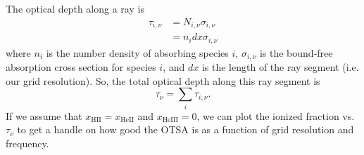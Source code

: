 \documentclass[letterpaper,titlepage,12pt]{article}
\numberwithin{equation}{section}
\newcommand{\xHII}{x_{\text{HII}}}
\newcommand{\xHeII}{x_{\text{HeII}}}
\newcommand{\xHeIII}{x_{\text{HeIII}}}
\begin{document}
The optical depth along a ray is
\begin{align}
    \tau_{i,\nu} & = N_{i,\nu} \sigma_{i,\nu} \nonumber \\
    & = n_i dx \sigma_{i,\nu}
\end{align}    
where $n_i$ is the number density of absorbing species $i$, $\sigma_{i, \nu}$ is the bound-free absorption cross section for species $i$, and $dx$ is the length of the ray segment (i.e. our grid resolution). So, the total optical depth along this ray segment is
\begin{equation}
    \tau_{\nu} = \sum_i \tau_{i, \nu} .
\end{equation}    
If we assume that $\xHII = \xHeII$ and $\xHeIII = 0$, we can plot the ionized fraction vs. $\tau_{\nu}$ to get a handle on how good the OTSA is as a function of grid resolution and frequency.


\newpage


\end{document}
